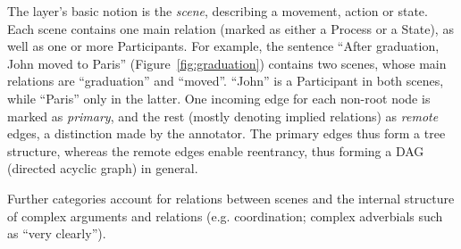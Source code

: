 \documentclass[11pt,a4paper]{article}
\newcommand{\figref}[1]{Figure~\ref{#1}}
\begin{document}
The layer's basic notion is the \textit{scene}, describing a movement, action or state.
Each scene contains one main relation (marked as either a Process or a State),
as well as one or more Participants.
For example, the sentence ``After graduation, John moved to Paris'' (\figref{fig:graduation})
contains two scenes, whose main relations are ``graduation'' and ``moved''.
``John'' is a Participant in both scenes, while ``Paris'' only in the latter.
One incoming edge for each non-root node is marked as \textit{primary},
and the rest (mostly denoting implied relations) as \textit{remote} edges,
a distinction made by the annotator.
The primary edges thus form a tree structure, whereas the remote edges enable reentrancy,
thus forming a DAG (directed acyclic graph) in general.

Further categories account for relations between scenes and the internal structure of
complex arguments and relations (e.g. coordination; complex
adverbials such as ``very clearly'').
\end{document}
